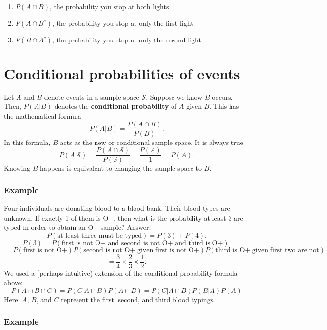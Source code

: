 \documentclass[]{book}
\providecommand{\tightlist}{%
  \setlength{\itemsep}{0pt}\setlength{\parskip}{0pt}}
\begin{document}
\begin{enumerate}
\def\labelenumi{\alph{enumi}.}
\tightlist
\item
  \(P(A\cap B)\), the probability you stop at both lights
\item
  \(P(A \cap B^c)\), the probability you stop at only the first light
\item
  \(P(B \cap A^c)\), the probability you stop at only the second light
\end{enumerate}

\chapter{Conditional probabilities of
events}\label{conditional-probabilities-of-events}

Let \(A\) and \(B\) denote events in a sample space \(\mathcal{S}\).
Suppose we know \(B\) occurs. Then, \(P(A|B)\) denotes the
\textbf{conditional probability} of \(A\) given \(B\). This has the
mathematical formula \[P(A|B) = \frac{P(A\cap B)}{P(B)}.\] In this
formula, \(B\) acts as the new or conditional sample space. It is always
true
\[P(A|\mathcal{S}) = \frac{P(A\cap \mathcal{S})}{P(\mathcal{S})} = \frac{P(A)}{1} = P(A).\]
Knowing \(B\) happens is equivalent to changing the sample space to
\(B\).

\subsection{Example}\label{example}

Four individuals are donating blood to a blood bank. Their blood types
are unknown. If exactly 1 of them is O+, then what is the probability at
least 3 are typed in order to obtain an O+ sample? Answer:
\[P(\text{at least three must be typed}) = P(3) + P(4).\]
\[P(3) = P(\text{first is not O+ and second is not O+ and third is O+}).\]
\[ = P(\text{first is not O+})P(\text{second is not O+ given first is not O+})P(\text{third is O+ given first two are not})\]
\[ = \frac{3}{4}\times \frac{2}{3}\times \frac{1}{2}.\] We used a
(perhaps intuitive) extension of the conditional probability formula
above:
\[P(A\cap B\cap C) = P(C|A\cap B)P(A \cap B) = P(C|A\cap B)P(B|A)P(A)\]
Here, \(A\), \(B\), and \(C\) represent the first, second, and third
blood typings.

\subsection{Example}\label{example-1}
\end{document}
